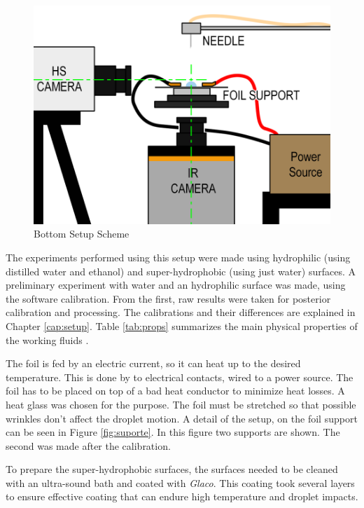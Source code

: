 

\begin{figure}[h]
\centering
\includegraphics[width=0.55\linewidth]{Figures/3.Chapter/setup.png}
\caption{Bottom Setup Scheme}
\label{fig:setup}
\end{figure}

\par The experiments performed using this setup were made using hydrophilic (using distilled water and ethanol) and super-hydrophobic (using just water) surfaces. A preliminary experiment with water and an hydrophilic surface was made, using the software calibration. From the first, raw results were taken for posterior calibration and processing. The calibrations and their differences are explained in Chapter \ref{cap:setup}. Table \ref{tab:props} summarizes the main physical properties of the working fluids \cite{tfc}.\\

\par The foil is fed by an electric current, so it can heat up to the desired temperature. This is done by to electrical contacts, wired to a power source. The foil has to be placed on top of a bad heat conductor to minimize heat losses. A heat glass was chosen for the purpose. The foil must be stretched so that possible wrinkles don't affect the droplet motion. A detail of the setup, on the foil support can be seen in Figure \ref{fig:suporte}. In this figure two supports are shown. The second was made after the calibration. \\

\par To prepare the super-hydrophobic surfaces, the surfaces needed to be cleaned with an ultra-sound bath and coated with \textit{Glaco}\textregistered \cite{kato2011durable}. This coating took several layers to ensure effective coating that can endure high temperature and droplet impacts. \\

